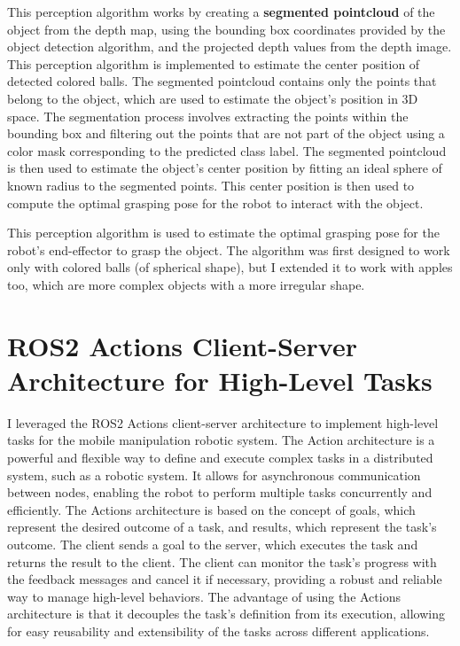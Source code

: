 This perception algorithm works by creating a \textbf{segmented pointcloud} of the object from the depth map, using the
bounding box coordinates provided by the object detection algorithm, and the projected depth values
from the depth image. This perception algorithm is implemented to estimate the center position
of detected colored balls. 
The segmented pointcloud contains only the points that belong to the object, which are used
to estimate the object's position in 3D space. The segmentation process involves extracting the points within
the bounding box and filtering out the points that are not part of the object using a color mask corresponding
to the predicted class label. The segmented pointcloud is then used to estimate the object's center position
by fitting an ideal sphere of known radius to the segmented points. This center position is then
used to compute the optimal grasping pose for the robot to interact with the object.

This perception algorithm is used to estimate the optimal grasping pose for the robot's end-effector to grasp
the object. The algorithm was first designed to work only with colored balls (of spherical shape),
but I extended it to work with apples too, which are more complex objects with a more irregular shape.


\section{ROS2 Actions Client-Server Architecture for High-Level Tasks}

I leveraged the ROS2 Actions client-server architecture to implement high-level tasks for the mobile manipulation
robotic system. The Action architecture is a powerful and flexible way to define and execute complex tasks
in a distributed system, such as a robotic system. It allows for asynchronous communication between nodes,
enabling the robot to perform multiple tasks concurrently and efficiently. The Actions architecture is based on
the concept of goals, which represent the desired outcome of a task, and results, which represent the task's outcome.
The client sends a goal to the server, which executes the task and returns the result to the client. The client
can monitor the task's progress with the feedback messages and cancel it if necessary, providing a robust 
and reliable way to manage high-level behaviors. The advantage of using the Actions architecture is that it decouples
the task's definition from its execution, allowing for easy reusability and extensibility of the tasks
across different applications. 

